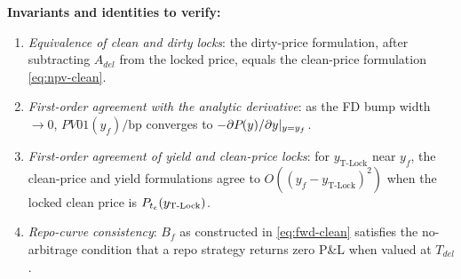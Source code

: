 \documentclass[11pt,a4paper]{article}
\begin{document}
\begin{validation}
\textbf{Invariants and identities to verify:}
\begin{enumerate}[noitemsep]
  \item \emph{Equivalence of clean and dirty locks}: the dirty-price
        formulation, after subtracting $A_{del}$ from the locked
        price, equals the clean-price formulation
        \eqref{eq:npv-clean}.
  \item \emph{First-order agreement with the analytic derivative}: as
        the FD bump width $\to 0$, $PV01(y_f) / \text{bp}$ converges
        to $-\partial P_{}(y) / \partial y |_{y=y_f}$.
  \item \emph{First-order agreement of yield and clean-price locks}:
        for $y_{\text{T-Lock}}$ near $y_f$, the clean-price and yield
        formulations agree to $O((y_f - y_{\text{T-Lock}})^2)$ when
        the locked clean price is $P_{t_e}(y_{\text{T-Lock}})$.
  \item \emph{Repo-curve consistency}: $B_f$ as constructed in
        \eqref{eq:fwd-clean} satisfies the no-arbitrage condition that
        a repo strategy returns zero P\&L when valued at $T_{del}$.
\end{enumerate}
\end{validation}

\end{document}
